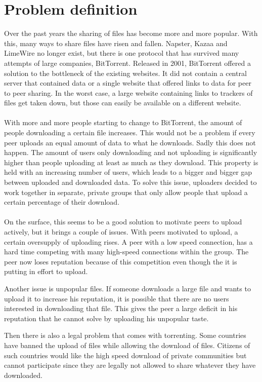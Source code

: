 \section{Problem definition}
Over the past years the sharing of files has become more and more popular. 
With this, many ways to share files have risen and fallen.
Napster, Kazaa and LimeWire no longer exist, but there is one protocol that has survived many attempts of large companies, BitTorrent.
Released in 2001, BitTorrent offered a solution to the bottleneck of the existing websites.
It did not contain a central server that contained data or a single website that offered links to data for peer to peer sharing.
In the worst case, a large website containing links to trackers of files get taken down, but those can easily be available on a different website. \\
\\
With more and more people starting to change to BitTorrent, the amount of people downloading a certain file increases.
This would not be a problem if every peer uploads an equal amount of data to what he downloads.
Sadly this does not happen.
The amount of users only downloading and not uploading is significantly higher than people uploading at least as much as they download.
This property is held with an increasing number of users, which leads to a bigger and bigger gap between uploaded and downloaded data.
To solve this issue, uploaders decided to work together in separate, private groups that only allow people that upload a certain percentage of their download.\\
\\
On the surface, this seems to be a good solution to motivate peers to upload actively, but it brings a couple of issues.
With peers motivated to upload, a certain oversupply of uploading rises.
A peer with a low speed connection, has a hard time competing with many high-speed connections within the group. The peer now loses reputation because of this competition even though the it is putting in effort to upload.

Another issue is unpopular files. 
If someone downloads a large file and wants to upload it to increase his reputation, it is possible that there are no users interested in downloading that file. 
This gives the peer a large deficit in his reputation that he cannot solve by uploading his unpopular taste.

Then there is also a legal problem that comes with torrenting. Some countries have banned the upload of files while allowing the download of files.
Citizens of such countries would like the high speed download of private communities but cannot participate since they are legally not allowed to share whatever they have downloaded.



